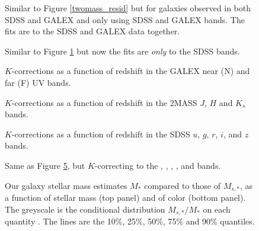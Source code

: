 \clearpage
{}
\begin{figure}
\figurenum{\fignum}
\caption{\label{galex_resid} Similar to Figure \ref{twomass_resid} but
for galaxies observed in both SDSS and GALEX and only using SDSS and
GALEX bands. The fits are to the SDSS and GALEX data together.}
\end{figure}

\clearpage
{}
\begin{figure}
\figurenum{\fignum}
\caption{\label{galex_predicted} Similar to Figure
\ref{galex_resid} but now the fits are {\it only} to the SDSS
bands. }
\end{figure}

\clearpage
{}
\begin{figure}
\figurenum{\fignum}
\caption{\label{galex_kcorrect} $K$-corrections as a function of
redshift in the GALEX near (N) and far (F) UV bands. }
\end{figure}

\clearpage
{}
\begin{figure}
\figurenum{\fignum}
\caption{\label{twomass_kcorrect} $K$-corrections as a function of
redshift in the 2MASS $J$, $H$ and $K_s$ bands.}
\end{figure}

\clearpage
{}
\begin{figure}
\figurenum{\fignum}
\caption{\label{sdss_kcorrect} $K$-corrections as a function of
redshift in the SDSS $u$, $g$, $r$, $i$, and $z$ bands.}
\end{figure}

\clearpage
{}
\begin{figure}
\figurenum{\fignum}
\caption{\label{main_kcorrect} Same as Figure \ref{sdss_kcorrect}, but
$K$-correcting to the , , ,
, and  bands.}  
\end{figure}

\clearpage
{}
\begin{figure}
\figurenum{\fignum}
\caption{\label{mass_to_garching} Our galaxy stellar mass estimates
	$M_\ast$ compared to those of \citet{kauffmann03a} $M_{s,\ast}$, as
	a function of stellar mass (top panel) and of color (bottom
	panel). The greyscale is the conditional distribution
	$M_{s,\ast}/M_\ast$ on each quantity . The lines are the 10\%, 25\%,
	50\%, 75\% and 90\% quantiles.}
\end{figure}


